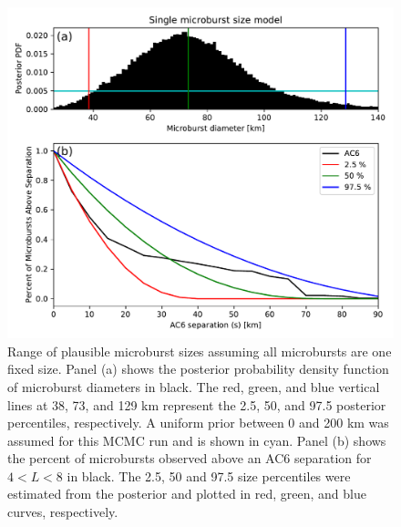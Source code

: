 \documentclass[draft]{agujournal2019}
\begin{document}
\begin{figure}
\includegraphics[width=\textwidth]{fig6.pdf}
\caption{Range of plausible microburst sizes assuming all microbursts are one fixed size. Panel (a) shows the posterior probability density function of microburst diameters in black. The red, green, and blue vertical lines at 38, 73, and 129 km represent the 2.5, 50, and 97.5 posterior percentiles, respectively. A uniform prior between 0 and 200 km was assumed for this MCMC run and is shown in cyan. Panel (b) shows the percent of microbursts observed above an AC6 separation for $4 < L < 8$ in black. The 2.5, 50 and 97.5 size percentiles were estimated from the posterior and plotted in red, green, and blue curves, respectively.} 
\label{fig6}
\end{figure}
\end{document}
